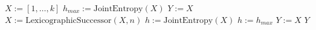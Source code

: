 \begin{algorithmic}[1]
        \State $X:=[1, \dots, k]$
        \State $h_{max}:=\textrm{JointEntropy}(X)$
        \State $Y:=X$
            \State $X:=\textrm{LexicographicSuccessor}(X, n)$
            \State $h:=\textrm{JointEntropy}(X)$
                \State $h:=h_{max}$
                \State $Y:=X$
            \EndIf
        \EndWhile
        \State \Return $Y$
    \EndFunction
\end{algorithmic}